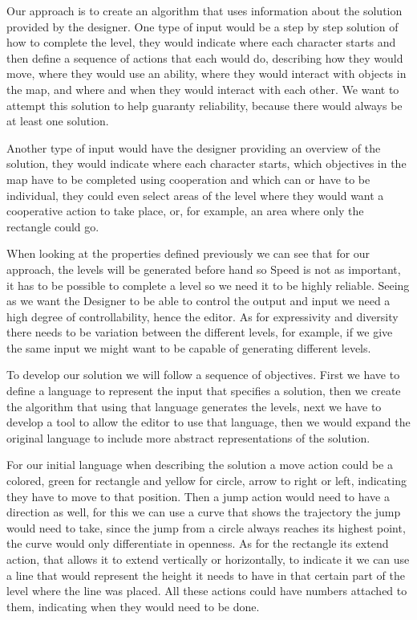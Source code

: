 \documentclass[runningheads]{llncs}
\begin{document}
Our approach is to create an algorithm that uses information about the solution provided by the designer. One type of input would be a step by step solution of how to complete the level, they would indicate where each character starts and then define a sequence of actions that each would do, describing how they would move, where they would use an ability, where they would interact with objects in the map, and where and when they would interact with each other. We want to attempt this solution to help guaranty reliability, because there would always be at least one solution.

Another type of input would have the designer providing an overview of the solution, they would indicate where each character starts, which objectives in the map have to be completed using cooperation and which can or have to be individual, they could even select areas of the level where they would want a cooperative action to take place, or, for example, an area where only the rectangle could go.

When looking at the properties defined previously we can see that for our approach, the levels will be generated before hand so Speed is not as important, it has to be possible to complete a level so we need it to be highly reliable. Seeing as we want the Designer to be able to control the output and input we need a high degree of controllability, hence the editor. As for expressivity and diversity there needs to be variation between the different levels, for example, if we give the same input we might want to be capable of generating different levels.

To develop our solution we will follow a sequence of objectives. First we have to define a language to represent the input that specifies a solution, then we create the algorithm that using that language generates the levels, next we have to develop a tool to allow the editor to use that language, then we would expand the original language to include more abstract representations of the solution.

For our initial language when describing the solution a move action could be a colored, green for rectangle and yellow for circle, arrow to right or left, indicating they have to move to that position. Then a jump action would need to have a direction as well, for this we can use a curve that shows the trajectory the jump would need to take, since the jump from a circle always reaches its highest point, the curve would only differentiate in openness. As for the rectangle its extend action, that allows it to extend vertically or horizontally, to indicate it we can use a line that would represent the height it needs to have in that certain part of the level where the line was placed. All these actions could have numbers attached to them, indicating when they would need to be done.
\end{document}
